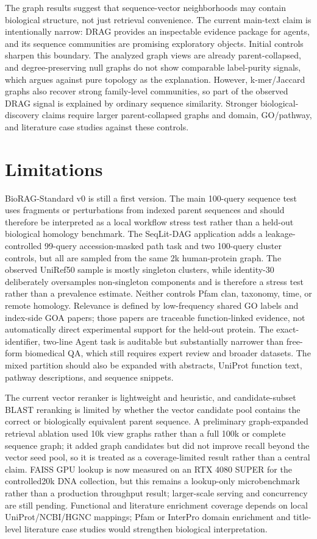 \documentclass[11pt]{article}
\begin{document}
The graph results suggest that sequence-vector neighborhoods may contain biological structure, not just retrieval convenience. The current main-text claim is intentionally narrow: DRAG provides an inspectable evidence package for agents, and its sequence communities are promising exploratory objects. Initial controls sharpen this boundary. The analyzed graph views are already parent-collapsed, and degree-preserving null graphs do not show comparable label-purity signals, which argues against pure topology as the explanation. However, k-mer/Jaccard graphs also recover strong family-level communities, so part of the observed DRAG signal is explained by ordinary sequence similarity. Stronger biological-discovery claims require larger parent-collapsed graphs and domain, GO/pathway, and literature case studies against these controls.

\section{Limitations}

BioRAG-Standard v0 is still a first version. The main 100-query sequence test uses fragments or perturbations from indexed parent sequences and should therefore be interpreted as a local workflow stress test rather than a held-out biological homology benchmark. The SeqLit-DAG application adds a leakage-controlled 99-query accession-masked path task and two 100-query cluster controls, but all are sampled from the same 2k human-protein graph. The observed UniRef50 sample is mostly singleton clusters, while identity-30 deliberately oversamples non-singleton components and is therefore a stress test rather than a prevalence estimate. Neither controls Pfam clan, taxonomy, time, or remote homology. Relevance is defined by low-frequency shared GO labels and index-side GOA papers; those papers are traceable function-linked evidence, not automatically direct experimental support for the held-out protein. The exact-identifier, two-line Agent task is auditable but substantially narrower than free-form biomedical QA, which still requires expert review and broader datasets. The mixed partition should also be expanded with abstracts, UniProt function text, pathway descriptions, and sequence snippets.

The current vector reranker is lightweight and heuristic, and candidate-subset BLAST reranking is limited by whether the vector candidate pool contains the correct or biologically equivalent parent sequence. A preliminary graph-expanded retrieval ablation used 10k view graphs rather than a full 100k or complete sequence graph; it added graph candidates but did not improve recall beyond the vector seed pool, so it is treated as a coverage-limited result rather than a central claim. FAISS GPU lookup is now measured on an RTX 4080 SUPER for the controlled20k DNA collection, but this remains a lookup-only microbenchmark rather than a production throughput result; larger-scale serving and concurrency are still pending. Functional and literature enrichment coverage depends on local UniProt/NCBI/HGNC mappings; Pfam or InterPro domain enrichment and title-level literature case studies would strengthen biological interpretation.
\end{document}
